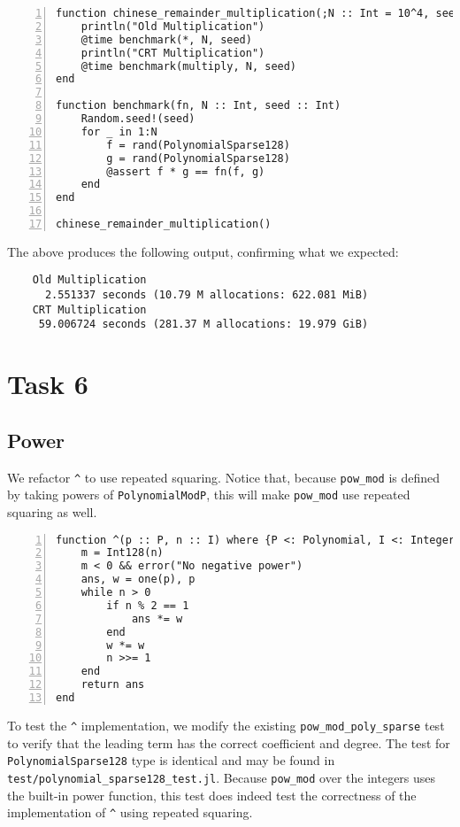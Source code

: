 \documentclass{article}
\theoremstyle{plain}
\numberwithin{theorem}{section}
\numberwithin{example}{section}
\theoremstyle{definition}
\numberwithin{definition}{section}
\begin{document}
\begin{codebox}
    \begin{Verbatim}[numbers=left,xleftmargin=5mm]
function chinese_remainder_multiplication(;N :: Int = 10^4, seed :: Int = 0)
    println("Old Multiplication")
    @time benchmark(*, N, seed)
    println("CRT Multiplication")
    @time benchmark(multiply, N, seed)
end

function benchmark(fn, N :: Int, seed :: Int)
    Random.seed!(seed)
    for _ in 1:N
        f = rand(PolynomialSparse128)
        g = rand(PolynomialSparse128)
        @assert f * g == fn(f, g)
    end
end

chinese_remainder_multiplication()
    \end{Verbatim}
\end{codebox}

The above produces the following output, confirming what we expected:

\begin{Verbatim}
    Old Multiplication
      2.551337 seconds (10.79 M allocations: 622.081 MiB)
    CRT Multiplication
     59.006724 seconds (281.37 M allocations: 19.979 GiB)
\end{Verbatim}

\bigbreak

\section{Task 6}
\subsection{Power}
We refactor \texttt{\^} to use repeated squaring. Notice that, because
\texttt{pow\_mod} is defined by taking powers of \texttt{PolynomialModP}, this
will make \texttt{pow\_mod} use repeated squaring as well.

\begin{codebox}
    \begin{Verbatim}[numbers=left,xleftmargin=5mm]
function ^(p :: P, n :: I) where {P <: Polynomial, I <: Integer}
    m = Int128(n)
    m < 0 && error("No negative power")
    ans, w = one(p), p
    while n > 0
        if n % 2 == 1
            ans *= w
        end
        w *= w
        n >>= 1
    end
    return ans
end
    \end{Verbatim}
\end{codebox}

To test the \texttt{\^} implementation, we modify the existing
\texttt{pow\_mod\_poly\_sparse} test to verify that the leading term has the
correct coefficient and degree. The test for \texttt{PolynomialSparse128} type
is identical and may be found in \texttt{test/polynomial\_sparse128\_test.jl}.
Because \texttt{pow\_mod} over the integers uses the built-in power function,
this test does indeed test the correctness of the implementation of \texttt{\^}
using repeated squaring.
\end{document}
